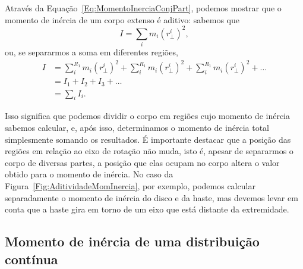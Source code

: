 Através da Equação~\ref{Eq:MomentoInerciaConjPart}, podemos mostrar que o momento de inércia de um corpo extenso é aditivo: sabemos que
\begin{equation}
    I = \sum_i m_i (r_\perp^i)^2,
\end{equation}
%
ou, se separarmos a soma em diferentes regiões,
\begin{align}
    I &= \sum_{i}^{R_1} m_i (r_\perp^i)^2 + \sum_{i}^{R_1} m_i (r_\perp^i)^2 + \sum_{i}^{R_1} m_i (r_\perp^i)^2 + \dots \\
    &= I_1 + I_2 + I_3 + \dots \\
    &= \sum_i I_i.
\end{align}

Isso significa que podemos dividir o corpo em regiões cujo momento de inércia sabemos calcular, e, após isso, determinamos o momento de inércia total simplesmente somando os resultados. É importante destacar que a posição das regiões em relação ao eixo de rotação não muda, isto é, apesar de separarmos o corpo de diversas partes, a posição que elas ocupam no corpo altera o valor obtido para o momento de inércia. No caso da Figura~\ref{Fig:AditividadeMomInercia}, por exemplo, podemos calcular separadamente o momento de inércia do disco e da haste, mas devemos levar em conta que a haste gira em torno de um eixo que está distante da extremidade.

\subsection{Momento de inércia de uma distribuição contínua}

